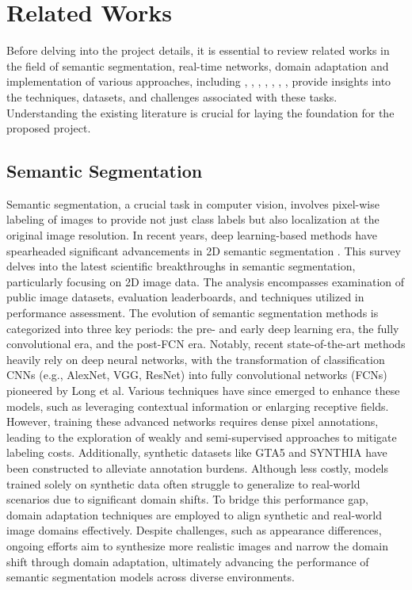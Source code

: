\documentclass[10pt,twocolumn,letterpaper]{article}
\begin{document}
\section{Related Works }


Before delving into the project details, it is essential to review related works in the field of semantic segmentation, real-time networks, domain adaptation and implementation of various approaches, including \cite{SemanticSeg}, \cite{Bisenet}, \cite{RealTimeBiSeNet}, \cite{VisDomAd}, \cite{City}, \cite{GroundTruth}, \cite{DomAd}, \cite{fda} provide insights into the techniques, datasets, and challenges associated with these tasks. Understanding the existing literature is crucial for laying the foundation for the proposed project.

\subsection{Semantic Segmentation}

Semantic segmentation, a crucial task in computer vision, involves pixel-wise labeling of images to provide not just class labels but also localization at the original image resolution. In recent years, deep learning-based methods have spearheaded significant advancements in 2D semantic segmentation \cite{SemanticSeg}. This survey delves into the latest scientific breakthroughs in semantic segmentation, particularly focusing on 2D image data. The analysis encompasses examination of public image datasets, evaluation leaderboards, and techniques utilized in performance assessment.
The evolution of semantic segmentation methods is categorized into three key periods: the pre- and early deep learning era, the fully convolutional era, and the post-FCN era. Notably, recent state-of-the-art methods heavily rely on deep neural networks, with the transformation of classification CNNs (e.g., AlexNet, VGG, ResNet) into fully convolutional networks (FCNs) pioneered by Long et al. Various techniques have since emerged to enhance these models, such as leveraging contextual information or enlarging receptive fields.
However, training these advanced networks requires dense pixel annotations, leading to the exploration of weakly and semi-supervised approaches to mitigate labeling costs. Additionally, synthetic datasets like GTA5\cite{GroundTruth} and SYNTHIA have been constructed to alleviate annotation burdens. Although less costly, models trained solely on synthetic data often struggle to generalize to real-world scenarios due to significant domain shifts.
To bridge this performance gap, domain adaptation techniques are employed to align synthetic and real-world image domains effectively. Despite challenges, such as appearance differences, ongoing efforts aim to synthesize more realistic images and narrow the domain shift through domain adaptation, ultimately advancing the performance of semantic segmentation models across diverse environments.
\end{document}
